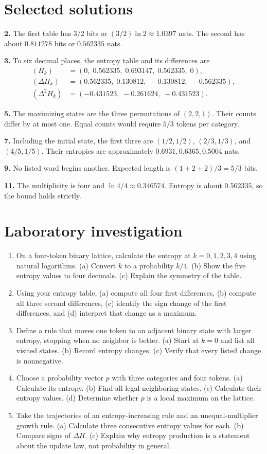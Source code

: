 \documentclass[11pt,oneside,openany]{book}
\theoremstyle{definition}
\theoremstyle{remark}
\numberwithin{equation}{chapter}
\providecommand{\tightlist}{\setlength{\itemsep}{0pt}\setlength{\parskip}{0pt}}
\newcommand{\labheading}{\FloatBarrier\section*{Laboratory investigation}\addcontentsline{toc}{section}{Laboratory investigation}}
\begin{document}
\section{Selected solutions}\label{ch05-selected-solutions}

\textbf{2.} The first table has \(3/2\) bits or \((3/2)\ln2\approx1.0397\) nats. The second has about \(0.811278\) bits or \(0.562335\) nats.

\textbf{3.} To six decimal places, the entropy table and its differences are \[\begin{aligned}
(H_k)&=(0,\;0.562335,\;0.693147,\;0.562335,\;0),\\
(\Delta H_k)&=(0.562335,\;0.130812,\;-0.130812,\;-0.562335),\\
(\Delta^2H_k)&=(-0.431523,\;-0.261624,\;-0.431523).
\end{aligned}\]

\textbf{5.} The maximizing states are the three permutations of \((2,2,1)\). Their counts differ by at most one. Equal counts would require \(5/3\) tokens per category.

\textbf{7.} Including the initial state, the first three are \((1/2,1/2)\), \((2/3,1/3)\), and \((4/5,1/5)\). Their entropies are approximately \(0.6931,0.6365,0.5004\) nats.

\textbf{9.} No listed word begins another. Expected length is \((1+2+2)/3=5/3\) bits.

\textbf{11.} The multiplicity is four and \(\ln4/4\approx0.346574\). Entropy is about \(0.562335\), so the bound holds strictly.
\labheading\begin{enumerate}
\def\labelenumi{\arabic{enumi}.}
\tightlist
\item
  On a four-token binary lattice, calculate the entropy at \(k=0,1,2,3,4\) using natural logarithms. (a) Convert \(k\) to a probability \(k/4\). (b) Show the five entropy values to four decimals. (c) Explain the symmetry of the table.
\item
  Using your entropy table, (a) compute all four first differences, (b) compute all three second differences, (c) identify the sign change of the first differences, and (d) interpret that change as a maximum.
\item
  Define a rule that moves one token to an adjacent binary state with larger entropy, stopping when no neighbor is better. (a) Start at \(k=0\) and list all visited states. (b) Record entropy changes. (c) Verify that every listed change is nonnegative.
\item
  Choose a probability vector \(p\) with three categories and four tokens. (a) Calculate its entropy. (b) Find all legal neighboring states. (c) Calculate their entropy values. (d) Determine whether \(p\) is a local maximum on the lattice.
\item
  Take the trajectories of an entropy-increasing rule and an unequal-multiplier growth rule. (a) Calculate three consecutive entropy values for each. (b) Compare signs of \(\Delta H\). (c) Explain why entropy production is a statement about the update law, not probability in general.
\end{enumerate}

\FloatBarrier
\end{document}
